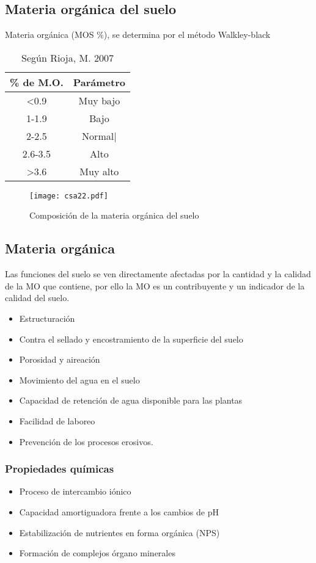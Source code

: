     \subsection{Materia orgánica del suelo}
    Materia orgánica (MOS \%), se determina por el método Walkley-black
    
    \begin{table}[h!]
        \centering
        \begin{tabular}{@{}cc@{}}
        \toprule
        \% de M.O.        & Parámetro \\ \midrule
        \textless{}0.9    & Muy bajo  \\
        1-1.9             & Bajo      \\
        2-2.5             & Normal|   \\
        2.6-3.5           & Alto      \\
        \textgreater{}3.6 & Muy alto  \\ \bottomrule
        \end{tabular}
        \caption{Según Rioja, M. 2007}
        \label{tabcsa6}
        \end{table}
    \begin{figure}[h!]
    \centering
      \texttt{[image: csa22.pdf]}
      \caption{Composición de la materia orgánica del suelo}
      \label{csa22}
    \end{figure}
    \subsection{Materia orgánica}
    Las funciones del suelo se ven directamente afectadas por la cantidad y la calidad de la MO que contiene, por ello la MO es un contribuyente y un indicador de la calidad del suelo.
    \begin{itemize}
        \item Estructuración
        \item Contra el sellado y encostramiento de la superficie del suelo
        \item Porosidad y aireación
        \item Movimiento del agua en el suelo
        \item Capacidad de retención de agua disponible para las plantas
        \item Facilidad de laboreo
        \item Prevención de los procesos erosivos.
    \end{itemize}
    \subsubsection{Propiedades químicas}
    \begin{itemize}
        \item Proceso de intercambio iónico
        \item Capacidad amortiguadora frente a los cambios de pH
        \item Estabilización de nutrientes en forma orgánica (NPS)
        \item Formación de complejos órgano minerales
    \end{itemize}

